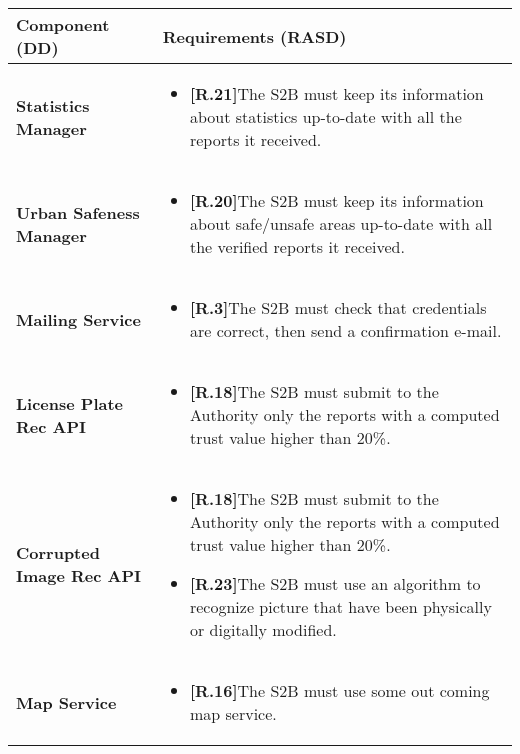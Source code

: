 \begin{table}[H]
\advance\leftskip-1.5cm
\begin{tabular}{|l|p{}|}
\hline
\textbf{\textbf{Component (DD)}}             &    \textbf{Requirements (RASD)}                                                           \\ \hline

\textbf{Statistics Manager}    &  \begin{itemize}
    \item \textbf{[R.21]}The S2B must keep its information about statistics up-to-date with all the reports it received.
\end{itemize} \\\hline

\textbf{Urban Safeness Manager}    & \begin{itemize}
    \item  \textbf{[R.20]}The S2B must keep its information about safe/unsafe areas up-to-date with all the verified reports it received.
\end{itemize}  \\\hline




\textbf{Mailing Service}    & \begin{itemize}
    \item \textbf{[R.3]}The S2B must check that credentials are correct, then send a confirmation e-mail.   
\end{itemize}
\\\hline


\textbf{License Plate Rec API}    & \begin{itemize}
    \item  \textbf{[R.18]}The S2B must submit to the Authority only the reports with a computed trust value higher than 20\%.
\end{itemize}  \\\hline


\textbf{Corrupted Image Rec API}    &   \begin{itemize}
     \item\textbf{[R.18]}The S2B must submit to the Authority only the reports with a computed trust value higher than 20\%. 
     
     \item \textbf{[R.23]}The S2B must use an algorithm to recognize picture that have been physically or digitally modified.
\end{itemize}
\\\hline


\textbf{Map Service}    &   \begin{itemize}
    \item \textbf{[R.16]}The S2B must use some out coming map service.
\end{itemize}\\\hline




\end{tabular}
\end{table}